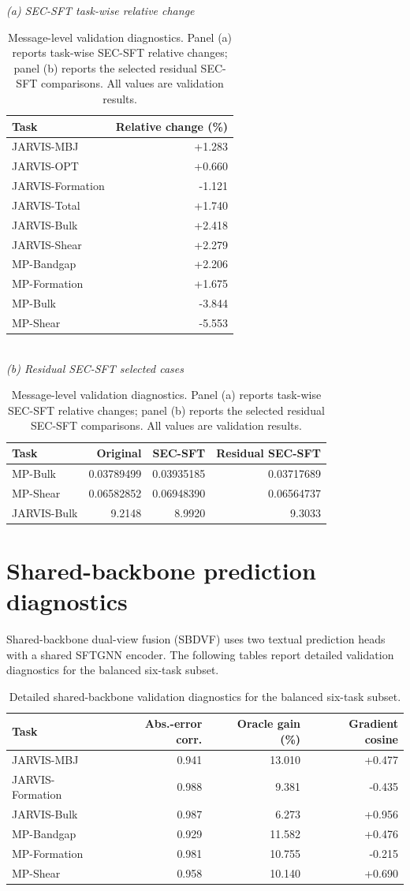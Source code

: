 \documentclass[a4paper,fleqn]{cas-sc}
\begin{document}
\begin{table}[!htbp]
\caption{Message-level validation diagnostics. Panel (a) reports task-wise SEC-SFT relative changes; panel (b) reports the selected residual SEC-SFT comparisons. All values are validation results.}
\label{tab:message_detail}\centering\scriptsize
\textit{(a) SEC-SFT task-wise relative change}\\[-2pt]
\begin{tabular}{lr}\toprule
Task&Relative change (\%)\\\midrule
JARVIS-MBJ&+1.283\\
JARVIS-OPT&+0.660\\
JARVIS-Formation&-1.121\\
JARVIS-Total&+1.740\\
JARVIS-Bulk&+2.418\\
JARVIS-Shear&+2.279\\
MP-Bandgap&+2.206\\
MP-Formation&+1.675\\
MP-Bulk&-3.844\\
MP-Shear&-5.553\\\bottomrule
\end{tabular}
\\[6pt]
\textit{(b) Residual SEC-SFT selected cases}\\[-2pt]
\begin{tabular}{lrrr}\toprule
Task&Original&SEC-SFT&Residual SEC-SFT\\\midrule
MP-Bulk&0.03789499&0.03935185&0.03717689\\
MP-Shear&0.06582852&0.06948390&0.06564737\\
JARVIS-Bulk&9.2148&8.9920&9.3033\\\bottomrule
\end{tabular}
\end{table}

\section{Shared-backbone prediction diagnostics}\label{app:shared}
Shared-backbone dual-view fusion (SBDVF) uses two textual prediction heads with a shared SFTGNN encoder. The following tables report detailed validation diagnostics for the balanced six-task subset.

\begin{table}[!htbp]
\caption{Detailed shared-backbone validation diagnostics for the balanced six-task subset.}
\label{tab:sbdvf_detail}\centering\scriptsize
\begin{tabular}{lrrr}\toprule
Task&Abs.-error corr.&Oracle gain (\%)&Gradient cosine\\\midrule
JARVIS-MBJ&0.941&13.010&+0.477\\
JARVIS-Formation&0.988&9.381&-0.435\\
JARVIS-Bulk&0.987&6.273&+0.956\\
MP-Bandgap&0.929&11.582&+0.476\\
MP-Formation&0.981&10.755&-0.215\\
MP-Shear&0.958&10.140&+0.690\\\bottomrule
\end{tabular}
\end{table}
\end{document}
